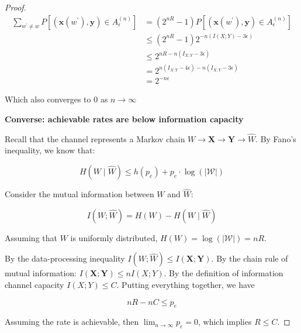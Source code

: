 \documentclass{article}
\newcommand{\norm}[1]{\vert {#1} \vert}
\begin{document}
\begin{proof}
        \begin{equation*}
            \begin{aligned}
                \sum_{w^\prime \neq w} P[(\mathbf{x}(w^\prime), \mathbf{y}) \in A_\epsilon^{(n)}]
                &= (2^{nR}-1)P[(\mathbf{x}(w^\prime), \mathbf{y}) \in A_\epsilon^{(n)}] \\
                &\leq (2^{nR}-1)2^{-n(I(X; Y) - 3\epsilon)} \\
                &\leq 2^{nR - n(I_{X;Y} - 3\epsilon)} \\
                &= 2^{n(I_{X;Y} - 4\epsilon) - n(I_{X;Y} - 3\epsilon)} \\
                &= 2^{-n\epsilon}
            \end{aligned}
        \end{equation*}

        Which also converges to 0 as $n \rightarrow \infty$

        \textbf{Converse: achievable rates are below information capacity}

        Recall that the channel represents a Markov chain $W \rightarrow \mathbf{X} \rightarrow \mathbf{Y} \rightarrow \hat{W}$. By Fano's inequality, we know that:

        \begin{equation*}
            H(W \mid \hat{W}) \leq h(p_e) + p_e \cdot \log(\norm{\mathcal{W}})
        \end{equation*}

        Consider the mutual information between $W$ and $\hat{W}$:

        \begin{equation*}
            I(W; \hat{W}) = H(W) - H(W \mid \hat{W})
        \end{equation*}

        Assuming that $W$ is uniformly distributed, $H(W) = \log(\norm{\mathcal{W}}) = nR$.

        By the data-processing inequality $I(W; \hat{W}) \leq I(\mathbf{X}; \mathbf{Y})$. By the chain rule of mutual information: $I(\mathbf{X}; \mathbf{Y}) \leq nI(X; Y)$. By the definition of information channel capacity $I(X; Y) \leq C$. Putting everything together, we have

        \begin{equation*}
            nR - nC \leq p_e
        \end{equation*}

        Assuming the rate is achievable, then $\lim_{n \rightarrow \infty}p_e = 0$, which implies $R \leq C$.
    \end{proof}
\end{document}
